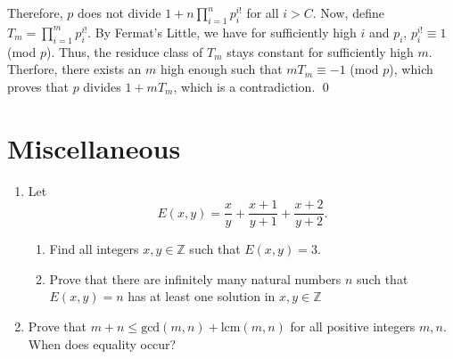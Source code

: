 \documentclass[a4paper, 12pt]{article}
\newcommand{\solution}[1]{%
   \emph{Solution}: 
    #1            
}
\renewcommand{\solution}[1]{}
\begin{document}
\begin{enumerate}
{Therefore, $p$ does not divide $1 + n \prod_{i=1}^n p_i^{i!}$ for all $i > C$. Now, define $T_m = \prod_{i=1}^m p_i^{i!}$. By Fermat's Little, we have for sufficiently high $i$ and $p_i$, $p_i^{i!} \equiv 1$ (mod $p$). Thus, the residuce class of $T_m$ stays constant for sufficiently high $m$. Therfore, there exists an $m$ high enough such that $m T_m \equiv -1$ (mod $p$), which proves that $p$ divides $1 + m T_m$, which is a contradiction. \qed

}


\end{enumerate}


\section{Miscellaneous}
\begin{enumerate}

\item Let 
\begin{equation*}
    E(x,y)=\frac{x}{y} +\frac{x+1}{y+1} +\frac{x+2}{y+2} .
\end{equation*}
\begin{enumerate}
    \item Find all integers $x, y \in \mathbb{Z}$ such that $E(x, y) = 3$.
    \item Prove that there are infinitely many natural numbers $ n $ such that$ E(x,y)=n $ has at least one solution in $x, y \in \mathbb{Z}$
\end{enumerate}

\solution{
\begin{enumerate}
    \item If $x < y$, then clearly $E(x, y) < 3$. Likewise, if $x > y$, then clearly $E(x, y) > 3$. Thus $x = y$, which easily checks to be a solution.
    
    \item For any $k \in \mathbb{Z}$, let $n = 11k + 3$. Then $x = 6k+1$ and $y = 1$ yields a solution to $E(x, y) = n$.
\end{enumerate}
\qed
}


\item Prove that $m + n \leq \textrm{gcd}(m, n) + \textrm{lcm}(m, n)$ for all positive integers $m, n$. When does equality occur?

\solution{ Let $d = \textrm{gcd}(m, n)$, and denote $m = da$ and $n = db$. We note that $\textrm{lcm}(m, n) = mn/d$. Thus, dividing the given inequality by $d$ gives a sufficient inequality to prove is $a + b \leq 1 + ab$ for all positive itnegers $a, b$. However, this is simply $(a - 1)(b - 1) \leq 0$ which is clearly true for all $a, b \geq 1$. Equality occurs only if either $a = 1$ or $b = 1$, which occurs iff $m$ or $n$ equals $d$, which occurs iff $m$ divdes $n$ or $n$ divides $m$. \qed
}


\end{enumerate}
\end{document}

